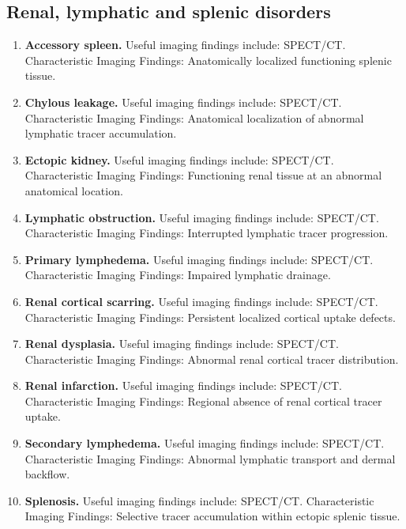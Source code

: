 \subsection{Renal, lymphatic and splenic disorders}
\begin{enumerate}[leftmargin=*,itemsep=0.45em,topsep=0.4em]
\item \textbf{Accessory spleen.} Useful imaging findings include: SPECT/CT. Characteristic Imaging Findings: Anatomically localized functioning splenic tissue.
\item \textbf{Chylous leakage.} Useful imaging findings include: SPECT/CT. Characteristic Imaging Findings: Anatomical localization of abnormal lymphatic tracer accumulation.
\item \textbf{Ectopic kidney.} Useful imaging findings include: SPECT/CT. Characteristic Imaging Findings: Functioning renal tissue at an abnormal anatomical location.
\item \textbf{Lymphatic obstruction.} Useful imaging findings include: SPECT/CT. Characteristic Imaging Findings: Interrupted lymphatic tracer progression.
\item \textbf{Primary lymphedema.} Useful imaging findings include: SPECT/CT. Characteristic Imaging Findings: Impaired lymphatic drainage.
\item \textbf{Renal cortical scarring.} Useful imaging findings include: SPECT/CT. Characteristic Imaging Findings: Persistent localized cortical uptake defects.
\item \textbf{Renal dysplasia.} Useful imaging findings include: SPECT/CT. Characteristic Imaging Findings: Abnormal renal cortical tracer distribution.
\item \textbf{Renal infarction.} Useful imaging findings include: SPECT/CT. Characteristic Imaging Findings: Regional absence of renal cortical tracer uptake.
\item \textbf{Secondary lymphedema.} Useful imaging findings include: SPECT/CT. Characteristic Imaging Findings: Abnormal lymphatic transport and dermal backflow.
\item \textbf{Splenosis.} Useful imaging findings include: SPECT/CT. Characteristic Imaging Findings: Selective tracer accumulation within ectopic splenic tissue.
\end{enumerate}

